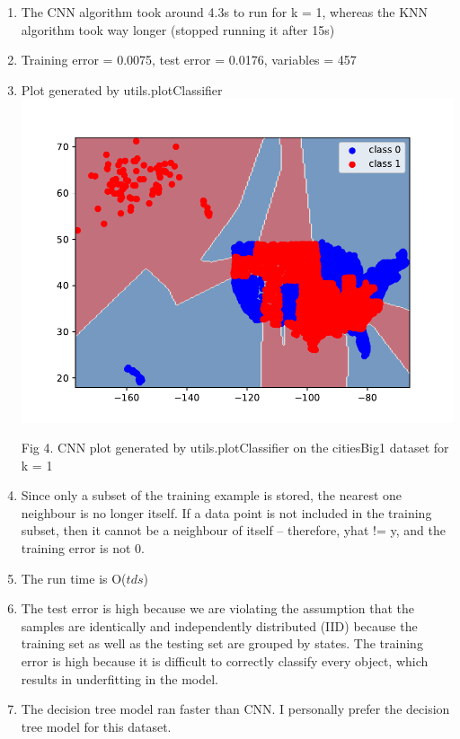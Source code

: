 \documentclass{article}
\def\enum#1{\begin{enumerate}#1\end{enumerate}}
\begin{document}
\enum{
\item The CNN algorithm took around 4.3s to run for k = 1, whereas the KNN algorithm took way longer (stopped running it after 15s)
\item Training error = 0.0075, test error = 0.0176, variables = 457
\item Plot generated by utils.plotClassifier \\
\includegraphics[scale=0.8]{../figs/q4_2_cnn_plot_classifier}
\\ \centerline{Fig 4. CNN plot generated by utils.plotClassifier on the citiesBig1 dataset for k = 1}
\item Since only a subset of the training example is stored, the nearest one neighbour is no longer itself. If a data point is not included in the training subset, then it cannot be a neighbour of itself -- therefore, yhat != y, and the training error is not 0. 
\item The run time is O($tds$)  
\item The test error is high because we are violating the assumption that the samples are identically and independently distributed (IID) because the training set as well as the testing set are grouped by states. The training error is high because it is difficult to correctly classify every object, which results in underfitting in the model.  
\item The decision tree model ran faster than CNN. I personally prefer the decision tree model for this dataset. \\
}
\end{document}
